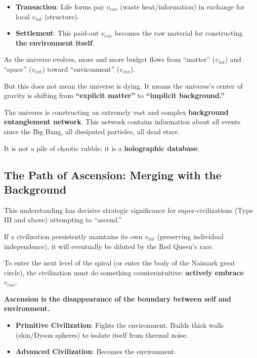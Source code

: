 \begin{itemize}
\item \textbf{Transaction}: Life forms pay $v_{env}$ (waste heat/information) in exchange for local $v_{int}$ (structure).

\item \textbf{Settlement}: This paid-out $v_{env}$ becomes the raw material for constructing \textbf{the environment itself}.
\end{itemize}

As the universe evolves, more and more budget flows from ``matter'' ($v_{int}$) and ``space'' ($v_{ext}$) toward ``environment'' ($v_{env}$).

But this does not mean the universe is dying. It means the universe's center of gravity is shifting from \textbf{``explicit matter''} to \textbf{``implicit background.''}

The universe is constructing an extremely vast and complex \textbf{background entanglement network}. This network contains information about all events since the Big Bang, all dissipated particles, all dead stars.

It is not a pile of chaotic rubble; it is a \textbf{holographic database}.

\subsection{The Path of Ascension: Merging with the Background}

This understanding has decisive strategic significance for super-civilizations (Type III and above) attempting to ``ascend.''

If a civilization persistently maintains its own $v_{int}$ (preserving individual independence), it will eventually be diluted by the Red Queen's race.

To enter the next level of the spiral (or enter the body of the Naimark great circle), the civilization must do something counterintuitive: \textbf{actively embrace $v_{env}$}.

\textbf{Ascension is the disappearance of the boundary between self and environment.}

\begin{itemize}
\item \textbf{Primitive Civilization}: Fights the environment. Builds thick walls (skin/Dyson spheres) to isolate itself from thermal noise.

\item \textbf{Advanced Civilization}: Becomes the environment.
\end{itemize}

